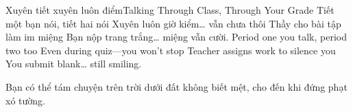\begin{tutuyetbox}{Xuyên tiết xuyên luôn điểm}{Talking Through Class, Through Your Grade}
Tiết một bạn nói, tiết hai nói
Xuyên luôn giờ kiểm… vẫn chưa thôi
Thầy cho bài tập làm im miệng
Bạn nộp trang trắng… miệng vẫn cười.
\tcblower
Period one you talk, period two too
Even during quiz—you won’t stop
Teacher assigns work to silence you
You submit blank… still smiling.
\end{tutuyetbox}

\begin{ghichu}
Bạn có thể tám chuyện trên trời dưới đất không biết mệt, cho đến khi đứng phạt xó tường.
\end{ghichu}